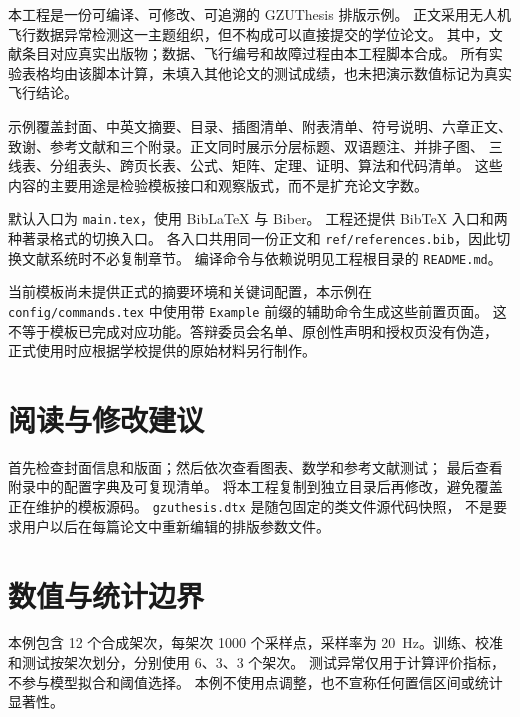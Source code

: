 本工程是一份可编译、可修改、可追溯的 GZUThesis 排版示例。
正文采用无人机飞行数据异常检测这一主题组织，但不构成可以直接提交的学位论文。
其中，文献条目对应真实出版物；数据、飞行编号和故障过程由本工程脚本合成。
所有实验表格均由该脚本计算，未填入其他论文的测试成绩，也未把演示数值标记为真实飞行结论。

示例覆盖封面、中英文摘要、目录、插图清单、附表清单、符号说明、六章正文、
致谢、参考文献和三个附录。正文同时展示分层标题、双语题注、并排子图、
三线表、分组表头、跨页长表、公式、矩阵、定理、证明、算法和代码清单。
这些内容的主要用途是检验模板接口和观察版式，而不是扩充论文字数。

默认入口为 \nolinkurl{main.tex}，使用 BibLaTeX 与 Biber。
工程还提供 BibTeX 入口和两种著录格式的切换入口。
各入口共用同一份正文和 \nolinkurl{ref/references.bib}，因此切换文献系统时不必复制章节。
编译命令与依赖说明见工程根目录的 \nolinkurl{README.md}。

当前模板尚未提供正式的摘要环境和关键词配置，本示例在
\nolinkurl{config/commands.tex} 中使用带 \texttt{Example} 前缀的辅助命令生成这些前置页面。
这不等于模板已完成对应功能。答辩委员会名单、原创性声明和授权页没有伪造，
正式使用时应根据学校提供的原始材料另行制作。

\section*{阅读与修改建议}
首先检查封面信息和版面；然后依次查看图表、数学和参考文献测试；
最后查看附录中的配置字典及可复现清单。
将本工程复制到独立目录后再修改，避免覆盖正在维护的模板源码。
\nolinkurl{gzuthesis.dtx} 是随包固定的类文件源代码快照，
不是要求用户以后在每篇论文中重新编辑的排版参数文件。

\section*{数值与统计边界}
本例包含 12 个合成架次，每架次 1000 个采样点，采样率为
\qty{20}{\hertz}。训练、校准和测试按架次划分，分别使用 6、3、3 个架次。
测试异常仅用于计算评价指标，不参与模型拟合和阈值选择。
本例不使用点调整，也不宣称任何置信区间或统计显著性。
